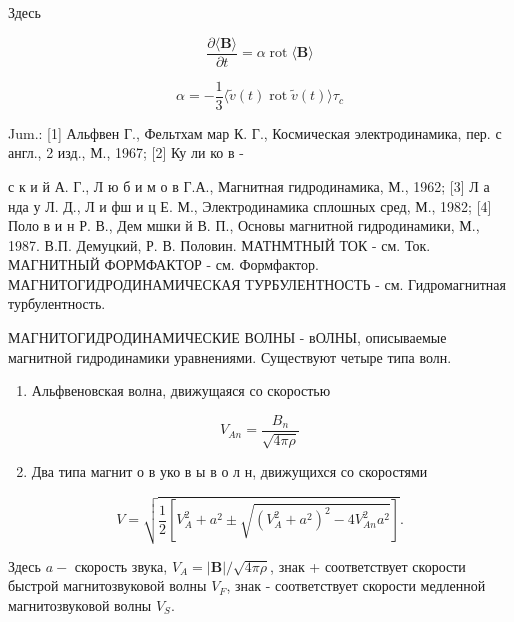 \documentclass[10pt]{article}
\begin{document}
Здесь



\[

\frac{\partial\langle\boldsymbol{B}\rangle}{\partial t}=\alpha \operatorname{rot}\langle\boldsymbol{B}\rangle

\]



\[

\alpha=-\frac{1}{3}\langle\tilde{v}(t) \operatorname{rot} \tilde{v}(t)\rangle \tau_{c}

\]



Jum.: [1] Альфвен Г., Фельтхам мар К. Г., Космическая электродинамика, пер. с англ., 2 изд., М., 1967; [2] Ку ли ко в -

с к и й А. Г., Л ю б и м о в Г.А., Магнитная гидродинамика, М., 1962; [3] Л а нда у Л. Д., Л и фш и ц Е. М., Электродинамика сплошных сред, М., 1982; [4] Поло в и н Р. В., Дем мшки й В. П., Основы магнитной гидродинамики, М., 1987. В.П. Демуцкий, Р. В. Половин. МАТНМТНЫЙ ТОК - см. Ток. МАГНИТНЫЙ ФОРМФАКТОР - см. Формфактор. МАГНИТОГИДРОДИНАМИЧЕСКАЯ ТУРБУЛЕНТНОСТЬ - см. Гидромагнитная турбулентность.



МАГНИТОГИДРОДИНАМИЧЕСКИЕ ВОЛНЫ - вОЛНЫ, описываемые магнитной гидродинамики уравнениями. Существуют четыре типа волн.



\begin{enumerate}

  \item Альфвеновская волна, движущаяся со скоростью

\end{enumerate}



\[

V_{A n}=\frac{B_{n}}{\sqrt{4 \pi \rho}}

\]



\begin{enumerate}

  \setcounter{enumi}{1}

  \item Два типа магнит о в уко в ы в о л н, движущихся со скоростями

\end{enumerate}



\[

V=\sqrt{\frac{1}{2}\left[V_{A}^{2}+a^{2} \pm \sqrt{\left(V_{A}^{2}+a^{2}\right)^{2}-4 V_{A n}^{2} a^{2}}\right]} .

\]



Здесь $a-$ скорость звука, $V_{A}=|\boldsymbol{B}| / \sqrt{4 \pi \rho}$, знак + соответствует скорости быстрой магнитозвуковой волны $V_{F}$, знак - соответствует скорости медленной магнитозвуковой волны $V_{S}$.
\end{document}
